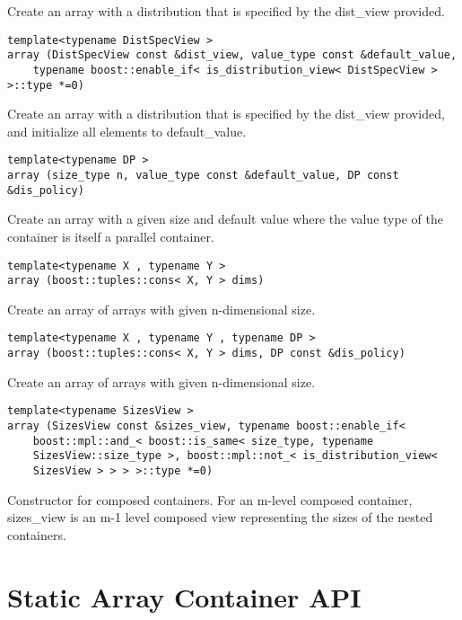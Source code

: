 Create an array with a distribution that is specified by the dist\_view provided. 
 
\begin{verbatim}
template<typename DistSpecView >
array (DistSpecView const &dist_view, value_type const &default_value, 
    typename boost::enable_if< is_distribution_view< DistSpecView > >::type *=0)
\end{verbatim}

Create an array with a distribution that is specified by the dist\_view provided, and initialize all elements to default\_value. 
 
\begin{verbatim}
template<typename DP >
array (size_type n, value_type const &default_value, DP const &dis_policy)
\end{verbatim}

Create an array with a given size and default value where the value type of the container is itself a parallel container. 
 
\begin{verbatim}
template<typename X , typename Y >
array (boost::tuples::cons< X, Y > dims)
\end{verbatim}

Create an array of arrays with given n-dimensional size. 
 
\begin{verbatim}
template<typename X , typename Y , typename DP >
array (boost::tuples::cons< X, Y > dims, DP const &dis_policy)
\end{verbatim}

Create an array of arrays with given n-dimensional size. 
 
\begin{verbatim}
template<typename SizesView >
array (SizesView const &sizes_view, typename boost::enable_if< 
    boost::mpl::and_< boost::is_same< size_type, typename 
    SizesView::size_type >, boost::mpl::not_< is_distribution_view< 
    SizesView > > > >::type *=0)
\end{verbatim}

Constructor for composed containers. For an m-level composed container, sizes\_view is an m-1 level composed view representing the sizes of the nested containers. 


\section{Static Array Container API } \label{sec-stary-cont}

